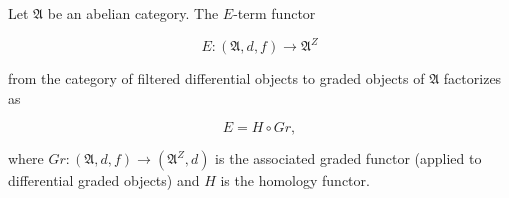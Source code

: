 Let $\mathfrak{A}$ be an abelian category. The $E$-term functor

$$E : (\mathfrak{A}, d, f) \rightarrow \mathfrak{A}^Z$$

from the category of filtered differential objects to graded objects of $\mathfrak{A}$ factorizes as

$$E = H \circ Gr,$$

where $Gr : (\mathfrak{A}, d, f) \rightarrow (\mathfrak{A}^Z, d)$ is the associated graded functor (applied to differential graded objects) and $H$ is the homology functor.
